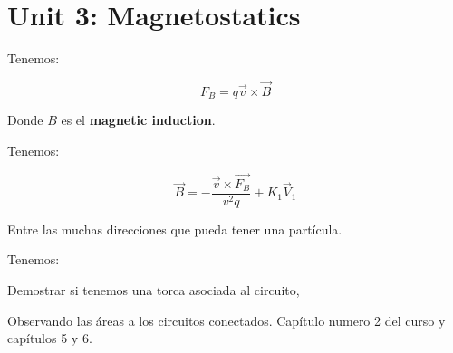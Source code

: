 \documentclass{article}
\begin{document}
\section{Unit 3: Magnetostatics}

Tenemos:

\[ F_{B} = q\vec{v} \times \vec{B} \]

Donde $B$ es el \textbf{magnetic induction}.

Tenemos:


\[ \vec{B} = - \frac{ \vec{v}\times \vec{F_{B}}  }{v^{2}q} + K_{1}\vec{V}_{1}  \]

Entre las muchas direcciones que pueda tener una partícula.

Tenemos:



Demostrar si tenemos una torca asociada al circuito, 


Observando las áreas a los circuitos conectados. Capítulo numero 2 del curso y capítulos 5 y 6.
\end{document}
